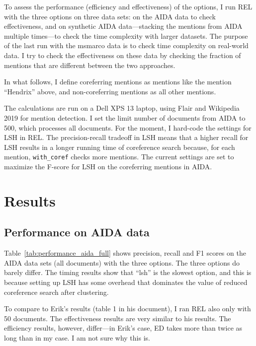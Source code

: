 \documentclass[a4paper,11pt]{article}
\numberwithin{equation}{section} %
\begin{document}
To assess the performance (efficiency and effectiveness) of the options, I run REL with the three options on three data sets: on the AIDA data to check effectiveness, and on synthetic AIDA data---stacking the mentions from AIDA multiple times---to check the time complexity with larger datasets. The purpose of the last run with the msmarco data is to check time complexity on real-world data. I try to check the effectiveness on these data by checking the fraction of mentions that are different between the two approaches. 

In what follows, I define coreferring mentions as mentions like the mention ``Hendrix'' above, and non-coreferring mentions as all other mentions.

The calculations are run on a Dell XPS 13 laptop, using Flair and Wikipedia 2019 for mention detection. I set the limit number of documents from AIDA to 500, which processes all documents. 
For the moment, I hard-code the settings for LSH in REL. The precision-recall tradeoff in LSH means that a higher recall for LSH results in a longer running time of coreference search because, for each mention, \verb|with_coref| checks more mentions. 
The current settings are set to maximize the F-score for LSH on the coreferring mentions in AIDA.



\section{Results}

\subsection{Performance on AIDA data}

Table~\ref{tab:performance_aida_full} shows precision, recall and F1 scores on the AIDA data sets (all documents) with the three options.
The three options do barely differ. The timing results show that ``lsh'' is the slowest option, and this is because setting up LSH has some overhead that dominates the value of reduced coreference search after clustering.

To compare to Erik's results (table 1 in his document), I ran REL also only with 50 documents. The effectiveness results are very similar to his results. The efficiency results, however, differ---in Erik's case, ED takes more than twice as long than in my case. I am not sure why this is.
\end{document}
